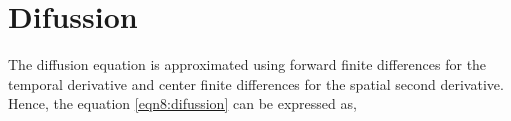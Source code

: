 \documentclass[main.tex]{subfiles}
\begin{document}
\section{Difussion}

The diffusion equation is approximated using forward finite differences for the temporal derivative and center finite differences for the spatial second derivative.
Hence, the equation \eqref{eqn8:difussion} can be expressed as,

\end{document}
